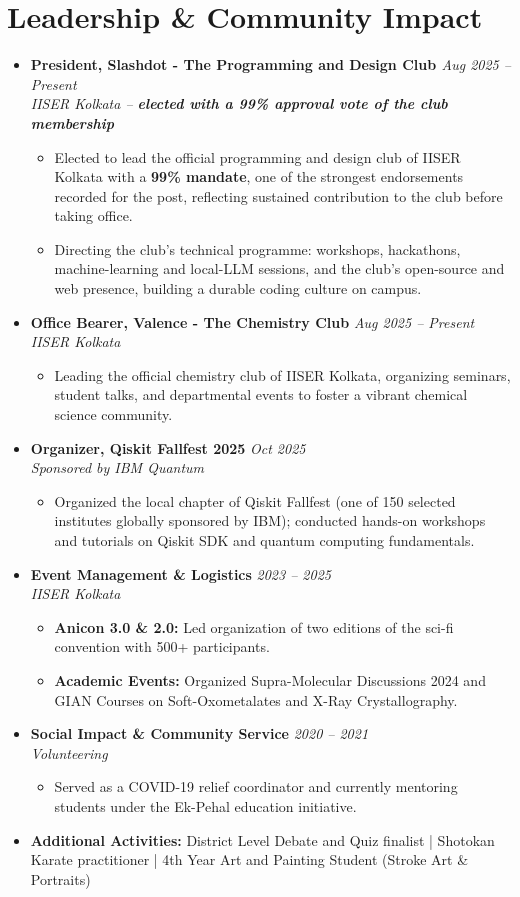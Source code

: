 \documentclass[a4paper,10pt]{article}
\newcommand{\resumeProject}[4]{
    \item\small{
        \textbf{#1} \hfill \textit{#2}\\
        \textit{#3}\\
        \begin{itemize}[leftmargin=1.5em,label=\textbullet,nosep,itemsep=0.5pt]
            #4
        \end{itemize}
    }\vspace{2pt}
}
\newcommand{\compactSection}[2]{
    \section{#1}
    \vspace{-0.1cm}
    #2
    \vspace{-0.2cm}
}
\begin{document}
\compactSection{Leadership \& Community Impact}{
\begin{itemize}[leftmargin=*,label={},itemsep=2pt]
    \resumeProject{President, Slashdot - The Programming and Design Club \href{https://slashdot-iiserk.github.io/}{\faGlobe}}{Aug 2025 -- Present}
    {IISER Kolkata -- \textbf{elected with a 99\% approval vote of the club membership}}
    {\item Elected to lead the official programming and design club of IISER Kolkata with a \textbf{99\% mandate}, one of the strongest endorsements recorded for the post, reflecting sustained contribution to the club before taking office.
    \item Directing the club's technical programme: workshops, hackathons, machine-learning and local-LLM sessions, and the club's open-source and web presence, building a durable coding culture on campus.}

    \resumeProject{Office Bearer, Valence - The Chemistry Club}{Aug 2025 -- Present}
    {IISER Kolkata}
    {\item Leading the official chemistry club of IISER Kolkata, organizing seminars, student talks, and departmental events to foster a vibrant chemical science community.}

    \resumeProject{Organizer, Qiskit Fallfest 2025}{Oct 2025}
    {Sponsored by IBM Quantum}
    {\item Organized the local chapter of Qiskit Fallfest (one of 150 selected institutes globally sponsored by IBM); conducted hands-on workshops and tutorials on Qiskit SDK and quantum computing fundamentals.}

    \resumeProject{Event Management \& Logistics}{2023 -- 2025}
    {IISER Kolkata}
    {\item \textbf{Anicon 3.0 \& 2.0:} Led organization of two editions of the sci-fi convention with 500+ participants.
     \item \textbf{Academic Events:} Organized Supra-Molecular Discussions 2024 and GIAN Courses on Soft-Oxometalates and X-Ray Crystallography.}

    \resumeProject{Social Impact \& Community Service}{2020 -- 2021}
    {Volunteering}
    {\item Served as a COVID-19 relief coordinator and currently mentoring students under the Ek-Pehal education initiative.}

    \item \textbf{Additional Activities:} \small {District Level Debate and Quiz finalist | Shotokan Karate practitioner | 4th Year Art and Painting Student (Stroke Art \& Portraits)}
\end{itemize}
}
\end{document}
